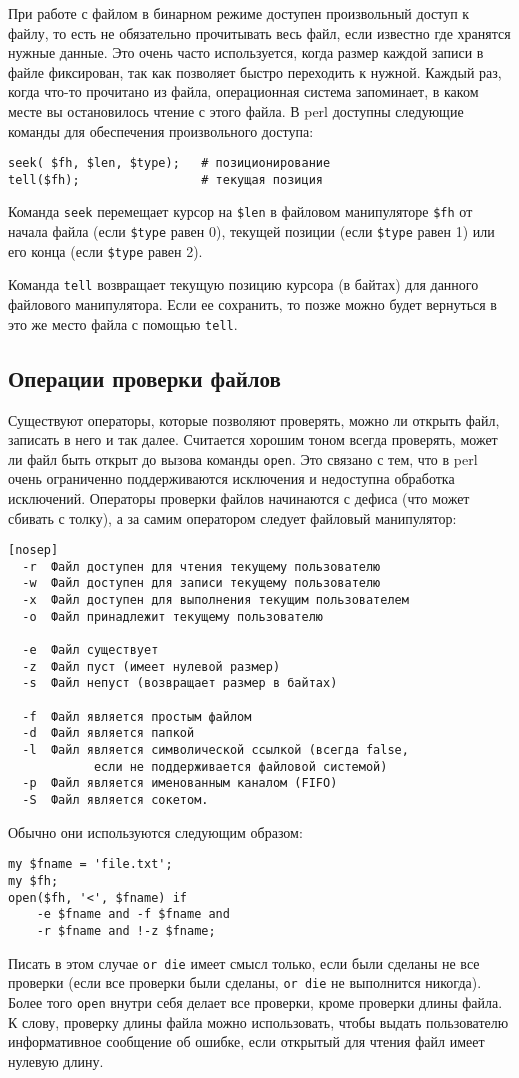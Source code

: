 При работе с файлом в бинарном режиме доступен произвольный доступ к файлу, то есть не обязательно прочитывать весь файл, если известно где хранятся нужные данные. Это очень часто используется, когда размер каждой записи в файле фиксирован, так как позволяет быстро переходить к нужной. Каждый раз, когда что-то прочитано из файла, операционная система запоминает, в каком месте вы остановилось чтение с этого файла. В perl доступны следующие команды для обеспечения произвольного доступа:
\begin{verbatim}
seek( $fh, $len, $type);   # позиционирование
tell($fh);                 # текущая позиция
\end{verbatim}
Команда \verb|seek| перемещает курсор на \verb|$len| в файловом манипуляторе \verb|$fh| от начала файла (если \verb|$type| равен 0), текущей позиции (если \verb|$type| равен 1) или его конца (если \verb|$type| равен 2).

Команда \verb|tell| возвращает текущую позицию курсора (в байтах) для данного файлового манипулятора. Если ее сохранить, то позже можно будет вернуться в это же место файла с помощью \verb|tell|.

\subsection{Операции проверки файлов}
Существуют операторы, которые позволяют проверять, можно ли открыть файл, записать в него и так далее. Считается хорошим тоном всегда проверять, может ли файл быть открыт до вызова команды \verb|open|. Это связано с тем, что в perl очень ограниченно поддерживаются исключения и недоступна обработка исключений. Операторы проверки файлов начинаются с дефиса (что может сбивать с толку), а за самим оператором следует файловый манипулятор:
\begin{verbatim}[nosep]
  -r  Файл доступен для чтения текущему пользователю
  -w  Файл доступен для записи текущему пользователю
  -x  Файл доступен для выполнения текущим пользователем
  -o  Файл принадлежит текущему пользователю

  -e  Файл существует
  -z  Файл пуст (имеет нулевой размер)
  -s  Файл непуст (возвращает размер в байтах)

  -f  Файл является простым файлом
  -d  Файл является папкой
  -l  Файл является символической ссылкой (всегда false,
            если не поддерживается файловой системой)
  -p  Файл является именованным каналом (FIFO)
  -S  Файл является сокетом.
\end{verbatim}
Обычно они используются следующим образом:
\begin{verbatim}
my $fname = 'file.txt';
my $fh;
open($fh, '<', $fname) if
    -e $fname and -f $fname and
    -r $fname and !-z $fname;
\end{verbatim}
Писать в этом случае \verb|or die| имеет смысл только, если были сделаны не все проверки (если все проверки были сделаны, \verb|or die| не выполнится никогда). Более того \verb|open| внутри себя делает все проверки, кроме проверки длины файла. К слову, проверку длины файла можно использовать, чтобы выдать пользователю информативное сообщение об ошибке, если открытый для чтения файл имеет нулевую длину.

